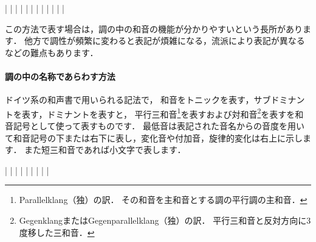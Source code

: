 \documentclass[dvipdfmx,uplatex,b5paper,openany,jbase=12Q,nomag*,textwidth-limit=44%
               ]{gachimuchi}[2020/05/05]
\begin{document}
\begin{Music}
  \Startpiece%
  \Notes%
  \zchordsl{\Gni}\cchordsu{}|%
  \en%
  \Notes%
  \zchordsl{\Gni}\figbassu[6]|%
  \en%
  \Notes%
  \zchordsl{\Gni}\figbassu[4][6]|%
  \en\doublebar%
  \Notes%
  \zchordsl{\Gni}|%
  \en%
  \Notes%
  |%
  \en%
  \Notes%
  |%
  \en\doublebar%
  \Notes%
  \zchordsl{\Gni}|%
  \en%
  \Notes%
  |%
  \en%
  \Notes%
  |%
  \en\doublebar%
  \Notes%
  \zchordsl{\Gni}|%
  \en%
  \Notes%
  \zchordsl{\Gni/\Gniii}|%
  \en%
  \Notes%
  \zchordsl{\Gni/\Gnv}|%
  \en\setdoublebar%
  \endpiece%
\end{Music}

この方法で表す場合は，調の中の和音の機能が分かりやすいという長所があります．
他方で調性が頻繁に変わると表記が煩雑になる，流派により表記が異なるなどの難点もあります．

\paragraph{調の中の名称であらわす方法}
ドイツ系の和声書で用いられる記法で，
和音をトニックを表す，サブドミナントを表す，ドミナントを表すと，
平行三和音\footnote{%
  Parallelklang（独）の訳．
  その和音を主和音とする調の平行調の主和音．
}を表すおよび対和音\footnote{%
  GegenklangまたはGegenparallelklang（独）の訳．
  平行三和音と反対方向に3度移した三和音．
}を表すを和音記号として使って表すものです．
最低音は表記された音名からの音度を用いて和音記号の下または右下に表し，変化音や付加音，旋律的変化は右上に示します．
また短三和音であれば小文字で表します．
\begin{Music}[0.8\linewidth]
  \Startpiece%
  \Notes%
  \zchordsu{}|%
  \en\Notes%
  |%
  \en\Notes%
  |%
  \en\bar
  \Notes%
  \zchordsu{}|%
  \en\Notes%
  \zchordsu{}|%
  \en\Notes%
  \zchordsu{}|%
  \en\Notes%
  \zchordsu{}|%
  \en\Notes%
  \zchordsu{}|%
  \en\setdoublebar%
  \endpiece%
\end{Music}
\end{document}
